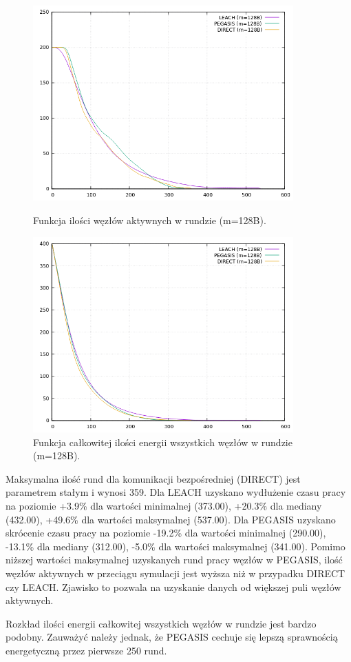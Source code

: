 \documentclass[a4paper,12pt,twoside,openany]{report}
\begin{document}
\begin{figure}[H]
 \centering
 \includegraphics[width=10cm]{images/gnuplot/test_1/nodes_in_round_m128.png}
 \caption{Funkcja ilości węzłów aktywnych w rundzie (m=128B).}
 \includegraphics[width=10cm]{images/gnuplot/test_1/energy_in_round_m128.png}
 \caption{Funkcja całkowitej ilości energii wszystkich węzłów w rundzie (m=128B).}
\end{figure}

\par
Maksymalna ilość rund dla komunikacji bezpośredniej (DIRECT) jest parametrem stałym i wynosi 359.
Dla LEACH uzyskano wydłużenie czasu pracy na poziomie +3.9\% dla wartości minimalnej (373.00), +20.3\% dla mediany (432.00), +49.6\% dla wartości maksymalnej (537.00).
Dla PEGASIS uzyskano skrócenie czasu pracy na poziomie -19.2\% dla wartości minimalnej (290.00), -13.1\% dla mediany (312.00), -5.0\% dla wartości maksymalnej (341.00).
Pomimo niższej wartości maksymalnej uzyskanych rund pracy węzłów w PEGASIS, ilość węzłów aktywnych w przeciągu symulacji jest wyższa niż w przypadku DIRECT czy LEACH.
Zjawisko to pozwala na uzyskanie danych od większej puli węzłów aktywnych.
\par
Rozkład ilości energii całkowitej wszystkich węzłów w rundzie jest bardzo podobny.
Zauważyć należy jednak, że PEGASIS cechuje się lepszą sprawnością energetyczną przez pierwsze 250 rund.
\end{document}
